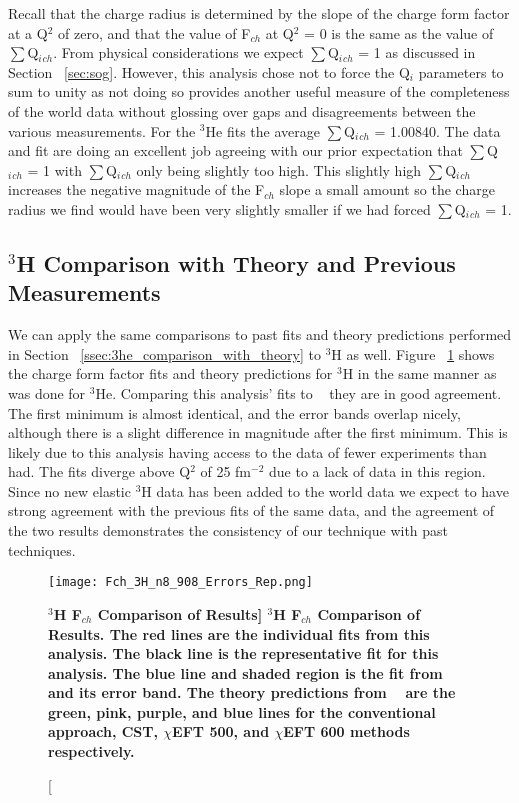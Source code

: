 Recall that the charge radius is determined by the slope of the charge form factor at a Q$^2$ of zero, and that the value of F$_{ch}$ at Q$^2$ = 0 is the same as the value of $\sum$Q$_i{_{ch}}$. From physical considerations we expect $\sum$Q$_i{_{ch}}$ = 1 as discussed in Section ~\ref{sec:sog}. However, this analysis chose not to force the Q$_i$ parameters to sum to unity as not doing so provides another useful measure of the completeness of the world data without glossing over gaps and disagreements between the various measurements. For the $^3$He fits the average $\sum$Q$_i{_{ch}}$ = 1.00840. The data and fit are doing an excellent job agreeing with our prior expectation that $\sum$Q$_i{_{ch}}$ = 1 with $\sum$Q$_i{_{ch}}$ only being slightly too high. This slightly high $\sum$Q$_i{_{ch}}$ increases the negative magnitude of the F$_{ch}$ slope a small amount so the charge radius we find would have been very slightly smaller if we had forced $\sum$Q$_i{_{ch}}$ = 1. 

\subsection{$^3$H Comparison with Theory and Previous Measurements}
\label{ssec:3h_comparison_with_theory}

We can apply the same comparisons to past fits and theory predictions performed in Section ~\ref{ssec:3he_comparison_with_theory} to $^3$H as well. Figure ~\ref{fig:3h_fch_theory} shows the charge form factor fits and theory predictions for $^3$H in the same manner as was done for $^3$He. Comparing this analysis' fits to ~\cite{Article:Amroun} they are in good agreement. The first minimum is almost identical, and the error bands overlap nicely, although there is a slight difference in magnitude after the first minimum. This is likely due to this analysis having access to the data of fewer experiments than ~\cite{Article:Amroun} had. The fits diverge above Q$^2$ of 25 fm$^{-2}$ due to a lack of data in this region. Since no new elastic $^3$H data has been added to the world data we expect to have strong agreement with the previous fits of the same data, and the agreement of the two results demonstrates the consistency of our technique with past techniques. 

\begin{figure}[!ht]
	\begin{center}
	\texttt{[image: Fch\_3H\_n8\_908\_Errors\_Rep.png]}
	\end{center}
	\caption[\bf{$^3$H F$_{ch}$ Comparison of Results}]{
	{\bf{$^3$H F$_{ch}$ Comparison of Results.}} The red lines are the individual fits from this analysis. The black line is the representative fit for this analysis. The blue line and shaded region is the fit from ~\cite{Article:Amroun} and its error band. The theory predictions from ~\cite{Article:Marcucci} are the green, pink, purple, and blue lines for the conventional approach, CST, $\chi$EFT 500, and $\chi$EFT 600 methods respectively.}
	\label{fig:3h_fch_theory}
\end{figure}


